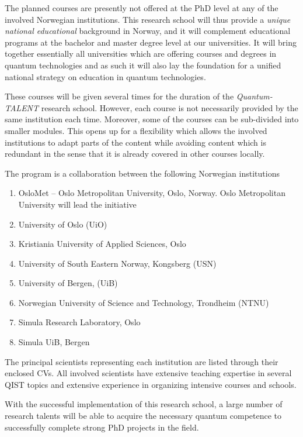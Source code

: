 \documentclass{scrreprt}
\begin{document}
The planned  courses are presently not offered at the PhD level at any
of the involved Norwegian institutions.  This research school will thus provide
a \textit{unique national educational} background in
Norway, and it will complement educational programs at the bachelor and
master degree level at our universities. It will bring together
essentially all universities which are offering courses and degrees in
quantum technologies and as such it will also lay the foundation for a
unified national strategy on education in quantum technologies.

These courses will be given several times for the duration of the \textit{Quantum-TALENT} research school. However, each course is not necessarily provided by the same institution each time. Moreover, some of the courses can be sub-divided into smaller modules. This opens up for a flexibility which allows the involved institutions to adapt parts of the content while avoiding content which is redundant in the sense that it is already covered in other courses locally.

The program is a collaboration between the following Norwegian institutions

\begin{enumerate}
\item OsloMet -- Oslo Metropolitan University, Oslo, Norway. Oslo Metropolitan University will lead the initiative
\item  University of Oslo (UiO)
\item Kristiania University of Applied Sciences, Oslo
\item University of South Eastern Norway, Kongsberg (USN)
\item  University of Bergen, (UiB)
\item Norwegian University of Science and Technology, Trondheim (NTNU)
\item Simula Research Laboratory, Oslo
\item Simula UiB, Bergen
\end{enumerate}
The principal scientists representing each institution are listed through their enclosed CVs. All involved scientists have extensive teaching expertise in several QIST topics and extensive experience in organizing intensive courses and schools. 

With the successful implementation of this research school, a large number of research talents will be able to acquire the necessary quantum competence to successfully complete strong PhD projects in the field.
\end{document}
